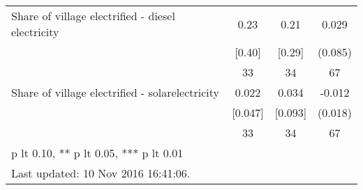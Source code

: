 \begin{table}[htbp]
\begin{tabular*}{0.9\hsize}{@{\hskip\tabcolsep\extracolsep\fill}l*{1}{ccc}}
Share of village electrified - diesel electricity&     0.23&     0.21&    0.029         \\
                                &   [0.40]&   [0.29]&  (0.085)         \\
                                &       33&       34&       67         \\
Share of village electrified - solarelectricity&    0.022&    0.034&   -0.012         \\
                                &  [0.047]&  [0.093]&  (0.018)         \\
                                &       33&       34&       67         \\
\bottomrule
\multicolumn{4}{l}{\footnotesize * p lt 0.10, ** p lt 0.05, *** p lt 0.01}\\
\multicolumn{4}{l}{\footnotesize Last updated: 10 Nov 2016 16:41:06.}\\
\end{tabular*}
\end{table}
